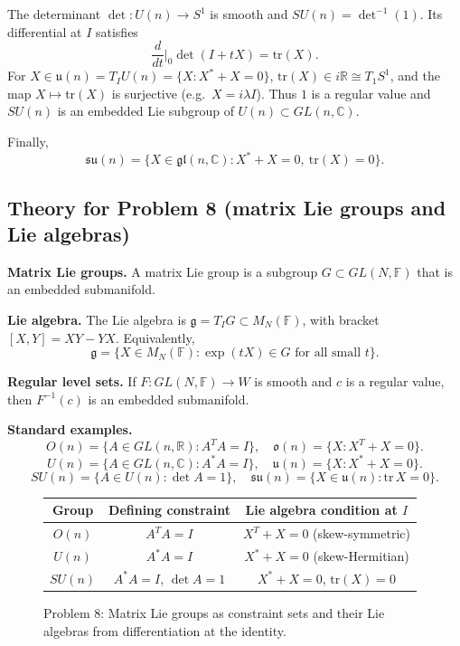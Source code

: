 \documentclass[12pt,a4paper]{article}
\theoremstyle{plain}
\theoremstyle{definition}      %
\begin{document}
The determinant $\det:U(n)\to S^1$ is smooth and $SU(n)=\det^{-1}(1)$.
Its differential at $I$ satisfies
\[
\frac{d}{dt}\Big|_{0}\det(I+tX)=\mathrm{tr}(X).
\]
For $X\in\mathfrak u(n)=T_IU(n)=\{X:X^*+X=0\}$, $\mathrm{tr}(X)\in i\mathbb R\cong T_1S^1$,
and the map $X\mapsto \mathrm{tr}(X)$ is surjective (e.g.\ $X=i\lambda I$).
Thus $1$ is a regular value and $SU(n)$ is an embedded Lie subgroup of $U(n)\subset GL(n,\mathbb C)$.

Finally,
\[
\mathfrak{su}(n)=\{X\in\mathfrak{gl}(n,\mathbb C):X^*+X=0,\ \mathrm{tr}(X)=0\}.
\]

\subsection*{Theory for Problem 8 (matrix Lie groups and Lie algebras)}

\textbf{Matrix Lie groups.}
A matrix Lie group is a subgroup $G\subset GL(N,\mathbb F)$ that is an embedded submanifold.

\textbf{Lie algebra.}
The Lie algebra is $\mathfrak g=T_I G\subset M_N(\mathbb F)$, with bracket $[X,Y]=XY-YX$.
Equivalently,
\[
\mathfrak g = \{X\in M_N(\mathbb F): \exp(tX)\in G \text{ for all small } t\}.
\]

\textbf{Regular level sets.}
If $F:GL(N,\mathbb F)\to W$ is smooth and $c$ is a regular value, then $F^{-1}(c)$ is an embedded submanifold.

\textbf{Standard examples.}
\[
O(n)=\{A\in GL(n,\mathbb R):A^TA=I\},\quad
\mathfrak o(n)=\{X:X^T+X=0\}.
\]
\[
U(n)=\{A\in GL(n,\mathbb C):A^*A=I\},\quad
\mathfrak u(n)=\{X:X^*+X=0\}.
\]
\[
SU(n)=\{A\in U(n):\det A=1\},\quad
\mathfrak{su}(n)=\{X\in\mathfrak u(n):\mathrm{tr}\,X=0\}.
\]

\begin{figure}[h]
	\centering
	\renewcommand{\arraystretch}{1.35}
	\begin{tabular}{|c|c|c|}
		\hline
		\textbf{Group} & \textbf{Defining constraint} & \textbf{Lie algebra condition at $I$} \\
		\hline
		$O(n)$ & $A^TA=I$ & $X^T+X=0$ (skew-symmetric) \\
		\hline
		$U(n)$ & $A^*A=I$ & $X^*+X=0$ (skew-Hermitian) \\
		\hline
		$SU(n)$ & $A^*A=I$, $\det A=1$ & $X^*+X=0$, $\mathrm{tr}(X)=0$ \\
		\hline
	\end{tabular}
	\caption{Problem 8: Matrix Lie groups as constraint sets and their Lie algebras from differentiation at the identity.}
\end{figure}
\end{document}
